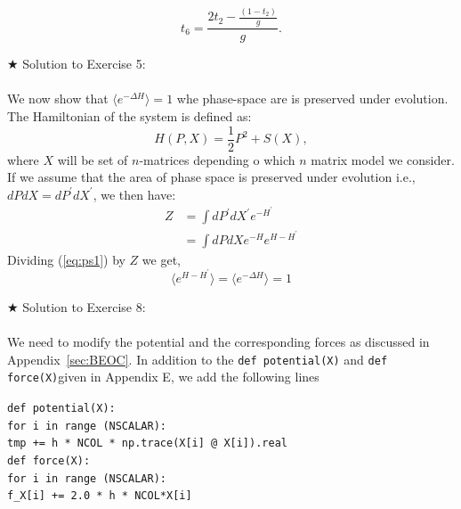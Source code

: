 \documentclass[11pt]{article}
\newcommand\tab[1][1cm]{\hspace*{#1}}
\begin{document}
     \begin{equation}
     	t_{6} = \frac{2t_{2} - \frac{(1-t_{2})}{g}}{g}. 
     \end{equation} 

\noindent $\bigstar$ Solution to Exercise 5:
\\ \\ We now show that $ \langle e^{-\Delta H} \rangle = 1$ whe phase-space are is preserved under evolution. The Hamiltonian of the system is defined as:
\begin{equation}
	H(P,X) = \frac{1}{2}P^2  + S(X), 
\end{equation} 
where $X$ will be set of $n$-matrices depending o which $n$ matrix model we consider. If we assume that the area of phase space is preserved under evolution i.e., $dP dX = dP^{\prime} dX^{\prime}$, we then have:
\begin{align}
	\label{eq:ps1} 
	Z &= \int dP^{\prime} dX^{\prime} e^{-H^{\prime} \nonumber }  \\
	&=  \int dP dX e^{-H} e^{H-H^{\prime}}
\end{align}
Dividing (\ref{eq:ps1}) by $Z$ we get, 
\begin{equation}
	\langle e^{H-H^{\prime}} \rangle = 	\langle e^{-\Delta H} \rangle = 1
\end{equation}

\noindent $\bigstar$ Solution to Exercise 8:
\\  \\ 
We need to modify the potential and the corresponding forces as discussed in Appendix~\ref{sec:BEOC}. In addition to the \verb"def potential(X)" 
and \verb"def force(X)"given in Appendix E, we add the following lines 

\begin{footnotesize} 

\begin{mdframed}[backgroundcolor=blue!3] 
 \verb"def potential(X):" \\
 \tab	\verb"for i in range (NSCALAR):" \\ 
    \tab     \tab	\verb"tmp += h * NCOL * np.trace(X[i] @ X[i]).real" \\
    
\vspace{5mm} 
\noindent
\verb"def force(X):" \\ 
\tab	\verb"for i in range (NSCALAR):"  \\ 
       \tab  \tab 	\verb"f_X[i] += 2.0 * h * NCOL*X[i] " 
\end{mdframed}
\end{footnotesize} 
\end{document}
